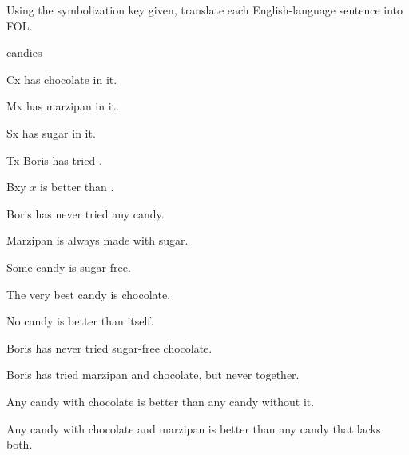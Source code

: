 \problempart
\label{pr.QLcandies}
Using the symbolization key given, translate each English-language sentence into FOL.
\begin{ekey}
\item[\text{domain}] candies
\item[Cx]  has chocolate in it.
\item[Mx]  has marzipan in it.
\item[Sx]  has sugar in it.
\item[Tx] Boris has tried .
\item[Bxy] $x$ is better than .
\end{ekey}
\begin{earg}
\item Boris has never tried any candy.
\item Marzipan is always made with sugar.
\item Some candy is sugar-free.
\item The very best candy is chocolate.
\item No candy is better than itself.
\item Boris has never tried sugar-free chocolate.
\item Boris has tried marzipan and chocolate, but never together.
\item Any candy with chocolate is better than any candy without it.
\item Any candy with chocolate and marzipan is better than any candy that lacks both.
\end{earg}


